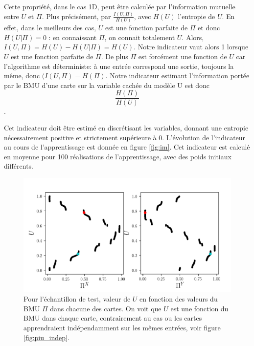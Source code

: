 Cette propriété, dans le cas 1D, peut être calculée par l'information mutuelle entre $U$ et $\Pi$. Plus précisément, par $\frac{I(U,\Pi)}{H(U)}$, avec $H(U)$ l'entropie de $U$. 
En effet, dans le meilleurs des cas, $U$ est une fonction parfaite de $\Pi$ et donc $H(U|\Pi ) = 0$ : en connaissant $\Pi$, on connait totalement $U$. Alors, $I(U,\Pi) = H(U) - H(U| \Pi) = H(U)$. 
Notre indicateur vaut alors 1 lorsque $U$ est une fonction parfaite de $\Pi$.
De plus $\Pi$ est forcément une fonction de $U$ car l'algorithme est déterministe: à une entrée correspond une sortie, toujours la même, donc $(I(U, \Pi) = H(\Pi)$. Notre indicateur estimant l'information portée par le BMU d'une carte sur la variable cachée du modèle U est donc $$\frac{H(\Pi)}{H(U)}$$.

Cet indicateur doit être estimé en discrétisant les variables, donnant une entropie nécessairement positive et strictement supérieure à 0.
L'évolution de l'indicateur au cours de l'apprentissage est donnée en figure \ref{fig:im}. Cet indicateur est calculé en moyenne pour 100 réalisations de l'apprentissage, avec des poids initiaux différents. 

\begin{figure}
\centering
\includegraphics[width = \textwidth]{XU_YU.pdf}
\caption{Pour l'échantillon de test, valeur de $U$ en fonction des valeurs du BMU $\Pi$ dans chacune des cartes. On voit que $U$ est une fonction du BMU dans chaque carte, contrairement au cas ou les cartes apprendraient indépendamment sur les mêmes entrées, voir figure \ref{fig:piu_indep}.}
\label{fig:piu}
\end{figure}

